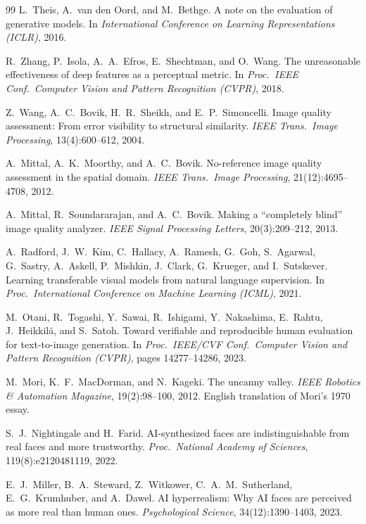 \documentclass[10pt,twocolumn]{article}
\begin{document}
\begin{thebibliography}{99}
L.~Theis, A.~van den Oord, and M.~Bethge.
A note on the evaluation of generative models.
In \emph{International Conference on Learning Representations (ICLR)}, 2016.

R.~Zhang, P.~Isola, A.~A.~Efros, E.~Shechtman, and O.~Wang.
The unreasonable effectiveness of deep features as a perceptual metric.
In \emph{Proc.\ IEEE Conf.\ Computer Vision and Pattern Recognition (CVPR)}, 2018.

Z.~Wang, A.~C.~Bovik, H.~R.~Sheikh, and E.~P.~Simoncelli.
Image quality assessment: From error visibility to structural similarity.
\emph{IEEE Trans.\ Image Processing}, 13(4):600--612, 2004.

A.~Mittal, A.~K.~Moorthy, and A.~C.~Bovik.
No-reference image quality assessment in the spatial domain.
\emph{IEEE Trans.\ Image Processing}, 21(12):4695--4708, 2012.

A.~Mittal, R.~Soundararajan, and A.~C.~Bovik.
Making a ``completely blind'' image quality analyzer.
\emph{IEEE Signal Processing Letters}, 20(3):209--212, 2013.

A.~Radford, J.~W.~Kim, C.~Hallacy, A.~Ramesh, G.~Goh, S.~Agarwal, G.~Sastry, A.~Askell, P.~Mishkin, J.~Clark, G.~Krueger, and I.~Sutskever.
Learning transferable visual models from natural language supervision.
In \emph{Proc.\ International Conference on Machine Learning (ICML)}, 2021.

M.~Otani, R.~Togashi, Y.~Sawai, R.~Ishigami, Y.~Nakashima, E.~Rahtu, J.~Heikkil{\"a}, and S.~Satoh.
Toward verifiable and reproducible human evaluation for text-to-image generation.
In \emph{Proc.\ IEEE/CVF Conf.\ Computer Vision and Pattern Recognition (CVPR)}, pages 14277--14286, 2023.

M.~Mori, K.~F.~MacDorman, and N.~Kageki.
The uncanny valley.
\emph{IEEE Robotics \& Automation Magazine}, 19(2):98--100, 2012.
English translation of Mori's 1970 essay.

S.~J.~Nightingale and H.~Farid.
{AI}-synthesized faces are indistinguishable from real faces and more trustworthy.
\emph{Proc.\ National Academy of Sciences}, 119(8):e2120481119, 2022.

E.~J.~Miller, B.~A.~Steward, Z.~Witkower, C.~A.~M.~Sutherland, E.~G.~Krumhuber, and A.~Dawel.
{AI} hyperrealism: Why {AI} faces are perceived as more real than human ones.
\emph{Psychological Science}, 34(12):1390--1403, 2023.


\end{thebibliography}
\end{document}
